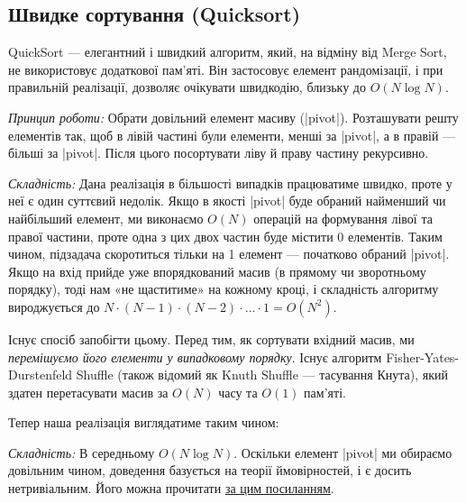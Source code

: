 \documentclass[12pt,a4paper]{report}
\begin{document}
\subsection{Швидке сортування (Quicksort)}

QuickSort --- елегантний і швидкий алгоритм, який, на відміну від Merge Sort, не використовує додаткової пам’яті. Він застосовує елемент рандомізації, і при правильній реалізації, дозволяє очікувати швидкодію, близьку до \(O(N \log N)\).

\emph{Принцип роботи:} Обрати довільний елемент масиву (|pivot|). Розташувати решту елементів так, щоб в лівій частині були елементи, менші за |pivot|, а в правій --- більші за |pivot|. Після цього посортувати ліву й праву частину рекурсивно.

\begin{minipage}{\linewidth}

\end{minipage}

\emph{Складність:} Дана реалізація в більшості випадків працюватиме швидко, проте у неї є один суттєвий недолік.
Якщо в якості |pivot| буде обраний найменший чи найбільший елемент, ми виконаємо \(O(N)\) операцій на формування лівої та правої частини, проте одна з цих двох частин буде містити 0 елементів.
Таким чином, підзадача скоротиться тільки на 1 елемент --- початково обраний |pivot|.
Якщо на вхід прийде уже впорядкований масив (в прямому чи зворотньому порядку), тоді нам «не щаститиме» на кожному кроці, і складність алгоритму вироджується до \(N \cdot (N - 1) \cdot (N - 2) \cdot ... \cdot 1 = O(N^2)\).

Існує спосіб запобігти цьому. Перед тим, як сортувати вхідний масив, ми \emph{перемішуємо його елементи у випадковому порядку}. Існує алгоритм Fisher-Yates-Durstenfeld Shuffle (також відомий як Knuth Shuffle --- тасування Кнута), який здатен перетасувати масив за \(O(N)\) часу та \(O(1)\) пам’яті.

Тепер наша реалізація виглядатиме таким чином:

\begin{minipage}{\linewidth}

\end{minipage}

\emph{Складність:} В середньому \(O(N \log N)\). Оскільки елемент |pivot| ми обираємо довільним чином, доведення базується на теорії ймовірностей, і є досить нетривіальним. Його можна прочитати \href{http://neerc.ifmo.ru/wiki/index.php?title=%D0%91%D1%8B%D1%81%D1%82%D1%80%D0%B0%D1%8F_%D1%81%D0%BE%D1%80%D1%82%D0%B8%D1%80%D0%BE%D0%B2%D0%BA%D0%B0#.D0.A1.D1.80.D0.B5.D0.B4.D0.BD.D0.B5.D0.B5_.D0.B2.D1.80.D0.B5.D0.BC.D1.8F_.D1.80.D0.B0.D0.B1.D0.BE.D1.82.D1.8B}{за цим посиланням}.
\end{document}
